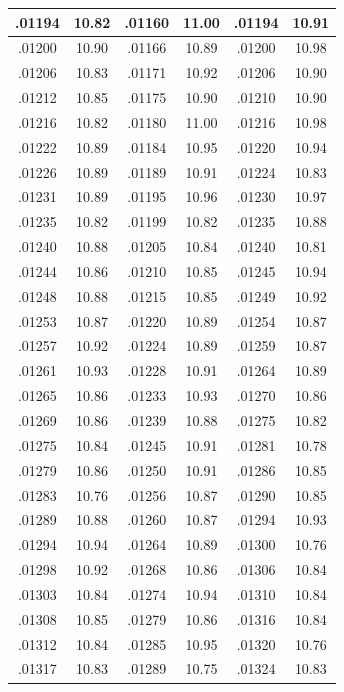 \documentclass[10pt,twoside]{report}
\begin{document}
\begin{appendices}
\begin{longtable}{|c|c||c|c||c|c|}
.01194 & 10.82 & .01160 & 11.00 & .01194 & 10.91\\\hline
.01200 & 10.90 & .01166 & 10.89 & .01200 & 10.98\\\hline
.01206 & 10.83 & .01171 & 10.92 & .01206 & 10.90\\\hline
.01212 & 10.85 & .01175 & 10.90 & .01210 & 10.90\\\hline
.01216 & 10.82 & .01180 & 11.00 & .01216 & 10.98\\\hline
.01222 & 10.89 & .01184 & 10.95 & .01220 & 10.94\\\hline
.01226 & 10.89 & .01189 & 10.91 & .01224 & 10.83\\\hline
.01231 & 10.89 & .01195 & 10.96 & .01230 & 10.97\\\hline
.01235 & 10.82 & .01199 & 10.82 & .01235 & 10.88\\\hline
.01240 & 10.88 & .01205 & 10.84 & .01240 & 10.81\\\hline
.01244 & 10.86 & .01210 & 10.85 & .01245 & 10.94\\\hline
.01248 & 10.88 & .01215 & 10.85 & .01249 & 10.92\\\hline
.01253 & 10.87 & .01220 & 10.89 & .01254 & 10.87\\\hline
.01257 & 10.92 & .01224 & 10.89 & .01259 & 10.87\\\hline
.01261 & 10.93 & .01228 & 10.91 & .01264 & 10.89\\\hline
.01265 & 10.86 & .01233 & 10.93 & .01270 & 10.86\\\hline
.01269 & 10.86 & .01239 & 10.88 & .01275 & 10.82\\\hline
.01275 & 10.84 & .01245 & 10.91 & .01281 & 10.78\\\hline
.01279 & 10.86 & .01250 & 10.91 & .01286 & 10.85\\\hline
.01283 & 10.76 & .01256 & 10.87 & .01290 & 10.85\\\hline
.01289 & 10.88 & .01260 & 10.87 & .01294 & 10.93\\\hline
.01294 & 10.94 & .01264 & 10.89 & .01300 & 10.76\\\hline
.01298 & 10.92 & .01268 & 10.86 & .01306 & 10.84\\\hline
.01303 & 10.84 & .01274 & 10.94 & .01310 & 10.84\\\hline
.01308 & 10.85 & .01279 & 10.86 & .01316 & 10.84\\\hline
.01312 & 10.84 & .01285 & 10.95 & .01320 & 10.76\\\hline
.01317 & 10.83 & .01289 & 10.75 & .01324 & 10.83\\\hline

\end{longtable}
\end{appendices}
\end{document}
